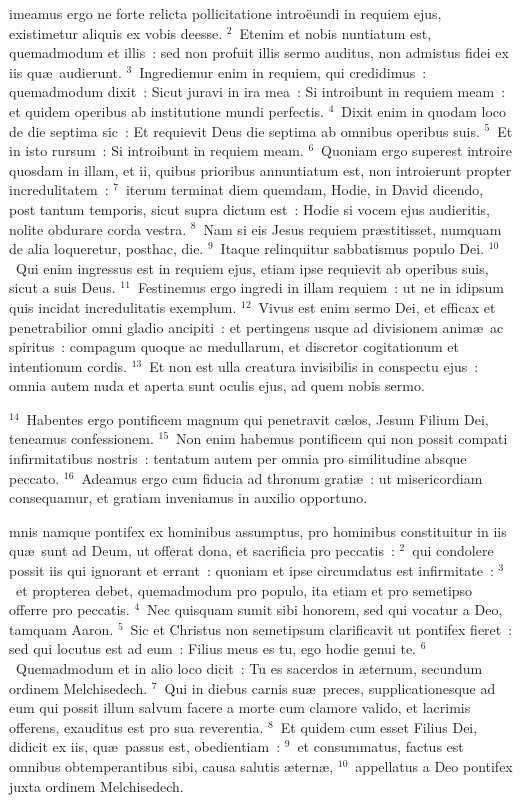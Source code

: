 \bchapter
{}imeamus ergo ne forte relicta pollicitatione intro\"eundi in requiem ejus, existimetur aliquis ex vobis deesse.
${}^{2}$~Etenim et nobis nuntiatum est, quemadmodum et illis~: sed non profuit illis sermo auditus, non admistus fidei ex iis qu\ae\ audierunt.
${}^{3}$~Ingrediemur enim in requiem, qui credidimus~: quemadmodum dixit~: Sicut juravi in ira mea~: Si introibunt in requiem meam~: et quidem operibus ab institutione mundi perfectis.
${}^{4}$~Dixit enim in quodam loco de die septima sic~: Et requievit Deus die septima ab omnibus operibus suis.
${}^{5}$~Et in isto rursum~: Si introibunt in requiem meam.
${}^{6}$~Quoniam ergo superest introire quosdam in illam, et ii, quibus prioribus annuntiatum est, non introierunt propter incredulitatem~:
${}^{7}$~iterum terminat diem quemdam, Hodie, in David dicendo, post tantum temporis, sicut supra dictum est~: Hodie si vocem ejus audieritis, nolite obdurare corda vestra.
${}^{8}$~Nam si eis Jesus requiem pr\ae stitisset, numquam de alia loqueretur, posthac, die.
${}^{9}$~Itaque relinquitur sabbatismus populo Dei.
${}^{10}$~Qui enim ingressus est in requiem ejus, etiam ipse requievit ab operibus suis, sicut a suis Deus.
${}^{11}$~Festinemus ergo ingredi in illam requiem~: ut ne in idipsum quis incidat incredulitatis exemplum.
${}^{12}$~Vivus est enim sermo Dei, et efficax et penetrabilior omni gladio ancipiti~: et pertingens usque ad divisionem anim\ae\ ac spiritus~: compagum quoque ac medullarum, et discretor cogitationum et intentionum cordis.
${}^{13}$~Et non est ulla creatura invisibilis in conspectu ejus~: omnia autem nuda et aperta sunt oculis ejus, ad quem nobis sermo.


${}^{14}$~Habentes ergo pontificem magnum qui penetravit c\ae los, Jesum Filium Dei, teneamus confessionem.
${}^{15}$~Non enim habemus pontificem qui non possit compati infirmitatibus nostris~: tentatum autem per omnia pro similitudine absque peccato.
${}^{16}$~Adeamus ergo cum fiducia ad thronum grati\ae~: ut misericordiam consequamur, et gratiam inveniamus in auxilio opportuno.

\bchapter
{}mnis namque pontifex ex hominibus assumptus, pro hominibus constituitur in iis qu\ae\ sunt ad Deum, ut offerat dona, et sacrificia pro peccatis~:
${}^{2}$~qui condolere possit iis qui ignorant et errant~: quoniam et ipse circumdatus est infirmitate~:
${}^{3}$~et propterea debet, quemadmodum pro populo, ita etiam et pro semetipso offerre pro peccatis.
${}^{4}$~Nec quisquam sumit sibi honorem, sed qui vocatur a Deo, tamquam Aaron.
${}^{5}$~Sic et Christus non semetipsum clarificavit ut pontifex fieret~: sed qui locutus est ad eum~: Filius meus es tu, ego hodie genui te.
${}^{6}$~Quemadmodum et in alio loco dicit~: Tu es sacerdos in \ae ternum, secundum ordinem Melchisedech.
${}^{7}$~Qui in diebus carnis su\ae\ preces, supplicationesque ad eum qui possit illum salvum facere a morte cum clamore valido, et lacrimis offerens, exauditus est pro sua reverentia.
${}^{8}$~Et quidem cum esset Filius Dei, didicit ex iis, qu\ae\ passus est, obedientiam~:
${}^{9}$~et consummatus, factus est omnibus obtemperantibus sibi, causa salutis \ae tern\ae ,
${}^{10}$~appellatus a Deo pontifex juxta ordinem Melchisedech.


